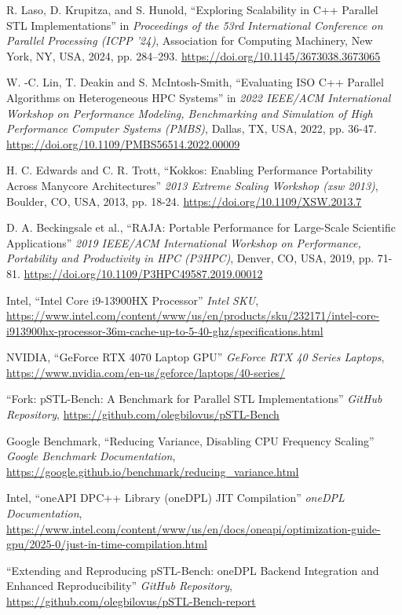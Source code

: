 \documentclass[sigconf]{acmart}
\begin{document}
\balance{}

\begin{thebibliography}{1}

      R. Laso, D. Krupitza, and S. Hunold, ``Exploring Scalability in C++ Parallel STL Implementations'' in \textit{Proceedings of the 53rd International Conference on Parallel Processing (ICPP '24)},
      Association for Computing Machinery, New York, NY, USA, 2024, pp. 284--293.
      \url{https://doi.org/10.1145/3673038.3673065}

      W. -C. Lin, T. Deakin and S. McIntosh-Smith, ``Evaluating ISO C++ Parallel Algorithms on Heterogeneous HPC Systems'' in  \textit{2022 IEEE/ACM International Workshop on Performance Modeling, Benchmarking and Simulation of High Performance Computer Systems (PMBS)},
      Dallas, TX, USA, 2022, pp. 36-47.
      \url{https://doi.org/10.1109/PMBS56514.2022.00009}

      H. C. Edwards and C. R. Trott, ``Kokkos: Enabling Performance Portability Across Manycore Architectures'' \textit{2013 Extreme Scaling Workshop (xsw 2013)},
      Boulder, CO, USA, 2013, pp. 18-24.
      \url{https://doi.org/10.1109/XSW.2013.7}

      D. A. Beckingsale et al., ``RAJA: Portable Performance for Large-Scale Scientific Applications'' \textit{2019 IEEE/ACM International Workshop on Performance, Portability and Productivity in HPC (P3HPC)},
      Denver, CO, USA, 2019, pp. 71-81.
      \url{https://doi.org/10.1109/P3HPC49587.2019.00012}

      Intel, ``Intel Core i9-13900HX Processor'' \textit{Intel SKU},
      \url{https://www.intel.com/content/www/us/en/products/sku/232171/intel-core-i913900hx-processor-36m-cache-up-to-5-40-ghz/specifications.html}

      NVIDIA, ``GeForce RTX 4070 Laptop GPU'' \textit{GeForce RTX 40 Series Laptops},
      \url{https://www.nvidia.com/en-us/geforce/laptops/40-series/}

      ``Fork: pSTL-Bench: A Benchmark for Parallel STL Implementations'' \textit{GitHub Repository},
      \url{https://github.com/olegbilovus/pSTL-Bench}

      Google Benchmark, ``Reducing Variance, Disabling CPU Frequency Scaling'' \textit{Google Benchmark Documentation},
      \url{https://google.github.io/benchmark/reducing_variance.html}

      Intel, ``oneAPI DPC++ Library (oneDPL) JIT Compilation'' \textit{oneDPL Documentation},
      \url{https://www.intel.com/content/www/us/en/docs/oneapi/optimization-guide-gpu/2025-0/just-in-time-compilation.html}

      ``Extending and Reproducing pSTL-Bench: oneDPL Backend Integration and Enhanced Reproducibility'' \textit{GitHub Repository},
      \url{https://github.com/olegbilovus/pSTL-Bench-report}

\end{thebibliography}
\end{document}
